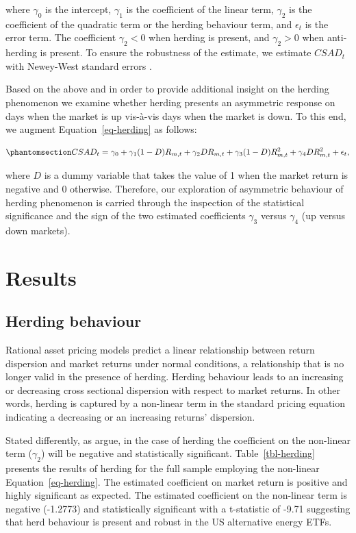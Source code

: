 \documentclass[
  letterpaper,
  DIV=11,
  numbers=noendperiod]{scrartcl}
\begin{document}
where \(\gamma_0\) is the intercept, \(\gamma_1\) is the coefficient of
the linear term, \(\gamma_2\) is the coefficient of the quadratic term
or the herding behaviour term, and \(\epsilon_t\) is the error term. The
coefficient \(\gamma_2 <0\) when herding is present, and \(\gamma_2 >0\)
when anti-herding is present. To ensure the robustness of the estimate,
we estimate \(CSAD_{t}\) with Newey-West standard errors
\citep[See][]{newey1987}.

Based on the above and in order to provide additional insight on the
herding phenomenon we examine whether herding presents an asymmetric
response on days when the market is up vis-à-vis days when the market is
down. To this end, we augment Equation~\ref{eq-herding} as follows:

\begin{equation}\phantomsection\label{eq-asymmetry}{
CSAD_t = \gamma_0 + \gamma_1(1-D) R_{m,t} + \gamma_2D R_{m,t} + \gamma_3(1-D) R_{m,t}^2  + \gamma_4D R_{m,t}^2 + \epsilon_t,
}\end{equation}

where \(D\) is a dummy variable that takes the value of 1 when the
market return is negative and 0 otherwise. Therefore, our exploration of
asymmetric behaviour of herding phenomenon is carried through the
inspection of the statistical significance and the sign of the two
estimated coefficients \(\gamma_3\) versus \(\gamma_4\) (up versus down
markets).

\section{Results}\label{results}

\subsection{Herding behaviour}\label{herding-behaviour}

Rational asset pricing models \citep[for example,][]{black1972} predict
a linear relationship between return dispersion and market returns under
normal conditions, a relationship that is no longer valid in the
presence of herding. Herding behaviour leads to an increasing or
decreasing cross sectional dispersion with respect to market returns. In
other words, herding is captured by a non-linear term in the standard
pricing equation indicating a decreasing or an increasing returns'
dispersion.

Stated differently, as \citet{chang2000} argue, in the case of herding
the coefficient on the non-linear term (\(\gamma_2\)) will be negative
and statistically significant. Table~\ref{tbl-herding} presents the
results of herding for the full sample employing the non-linear
Equation~\ref{eq-herding}. The estimated coefficient on market return is
positive and highly significant as expected. The estimated coefficient
on the non-linear term is negative (-1.2773) and statistically
significant with a t-statistic of -9.71 suggesting that herd behaviour
is present and robust in the US alternative energy ETFs.
\end{document}
